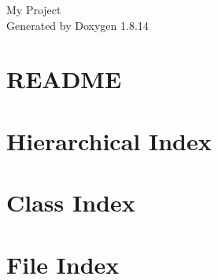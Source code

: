 \documentclass[twoside]{book}
\newcommand{\+}{\discretionary{\mbox{\scriptsize$\hookleftarrow$}}{}{}}
\newcommand{\clearemptydoublepage}{%
  \newpage{\pagestyle{empty}\cleardoublepage}%
}
\begin{document}
\hypersetup{pageanchor=false,
             bookmarksnumbered=true,
             pdfencoding=unicode
            }
\begin{titlepage}
\vspace*{7cm}
\begin{center}%
{\Large My Project }\\
\vspace*{1cm}
{\large Generated by Doxygen 1.8.14}\\
\end{center}
\end{titlepage}
\clearemptydoublepage
{}
\tableofcontents
\clearemptydoublepage
{}
\hypersetup{pageanchor=true}

\chapter{R\+E\+A\+D\+ME}
\label{md__r_e_a_d_m_e}

\chapter{Hierarchical Index}

\chapter{Class Index}

\chapter{File Index}

\end{document}
